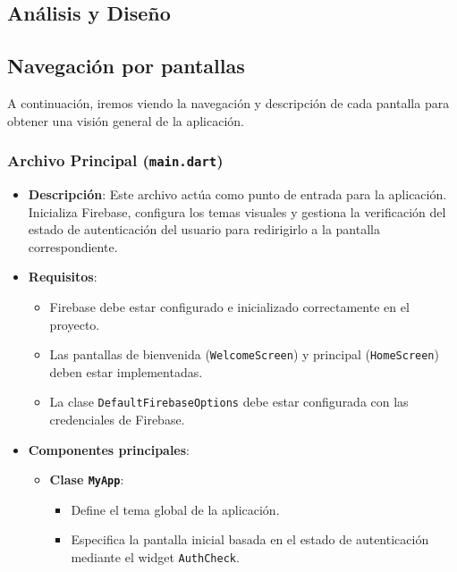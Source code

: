 \documentclass{article}
\begin{document}
\begin{flushleft}
\section{An\'alisis y Dise\~no}

\subsection{Navegaci\'on por pantallas}
A continuaci\'on, iremos viendo la navegaci\'on y descripci\'on de cada pantalla para obtener una visi\'on general de la aplicaci\'on.

\subsubsection{Archivo Principal (\texttt{main.dart})}
\begin{itemize}
    \item \textbf{Descripci\'on}: 
    Este archivo act\'ua como punto de entrada para la aplicaci\'on. Inicializa Firebase, configura los temas visuales y gestiona la verificaci\'on del estado de autenticaci\'on del usuario para redirigirlo a la pantalla correspondiente.

    \item \textbf{Requisitos}: 
    \begin{itemize}
        \item Firebase debe estar configurado e inicializado correctamente en el proyecto.
        \item Las pantallas de bienvenida (\texttt{WelcomeScreen}) y principal (\texttt{HomeScreen}) deben estar implementadas.
        \item La clase \texttt{DefaultFirebaseOptions} debe estar configurada con las credenciales de Firebase.
    \end{itemize}

    \item \textbf{Componentes principales}:
    \begin{itemize}
        \item \textbf{Clase \texttt{MyApp}}:
        \begin{itemize}
            \item Define el tema global de la aplicaci\'on.
            \item Especifica la pantalla inicial basada en el estado de autenticaci\'on mediante el widget \texttt{AuthCheck}.
        \end{itemize}


\end{itemize}
\end{itemize}
\end{flushleft}
\end{document}
